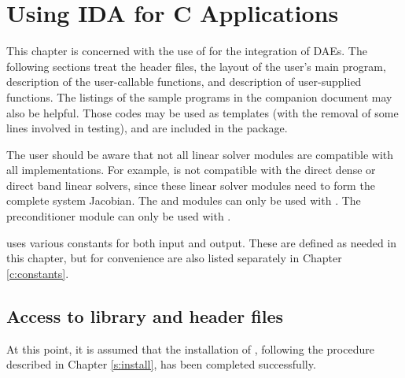 \chapter{Using IDA for C Applications}\label{s:simulation}

This chapter is concerned with the use of {\ida} for the integration of DAEs.
The following sections treat the header files, the layout of the user's main
program, description of the {\ida} user-callable functions, and 
description of user-supplied functions. 
The listings of the sample programs in the companion document \cite{ida2.4.0_ex} 
may also be helpful. Those codes may be used as templates (with the removal of
some lines involved in testing), and are included in the {\ida} package.

The user should be aware that not all linear solver modules are compatible 
with all {\nvector} implementations. 
For example, {\nvecp} is not compatible with the direct dense or direct band 
linear solvers, since these linear solver modules need to form the complete
system Jacobian.
The {\idadense} and {\idaband} modules can only be used with {\nvecs}. 
The preconditioner module {\idabbdpre} can only be used with {\nvecp}. 

{\ida} uses various constants for both input and output.  These are
defined as needed in this chapter, but for convenience are also listed
separately in Chapter \ref{c:constants}.

\section{Access to library and header files}\label{ss:file_access}

At this point, it is assumed that the installation of {\ida},
following the procedure described in Chapter \ref{s:install}, has
been completed successfully.

